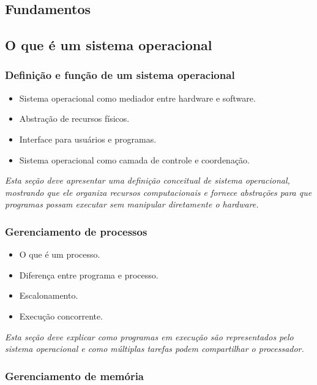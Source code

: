 \documentclass[12pt,openany]{book}
\newcommand{\placeholder}[1]{
    \par\medskip
    \noindent\textit{#1}
    \par\medskip
}
\newcommand{\topicos}[1]{
    \begin{itemize}
        #1
    \end{itemize}
}
\begin{document}
\cleardoublepage
\tableofcontents


\begin{refsection}
\part{Fundamentos}

\chapter{O que é um sistema operacional}

\section{Definição e função de um sistema operacional}

\topicos{
    \item Sistema operacional como mediador entre hardware e software.
    \item Abstração de recursos físicos.
    \item Interface para usuários e programas.
    \item Sistema operacional como camada de controle e coordenação.
}

\placeholder{Esta seção deve apresentar uma definição conceitual de sistema operacional, mostrando que ele organiza recursos computacionais e fornece abstrações para que programas possam executar sem manipular diretamente o hardware.}

\section{Gerenciamento de processos}

\topicos{
    \item O que é um processo.
    \item Diferença entre programa e processo.
    \item Escalonamento.
    \item Execução concorrente.
}

\placeholder{Esta seção deve explicar como programas em execução são representados pelo sistema operacional e como múltiplas tarefas podem compartilhar o processador.}

\section{Gerenciamento de memória}


\end{refsection}
\end{document}
